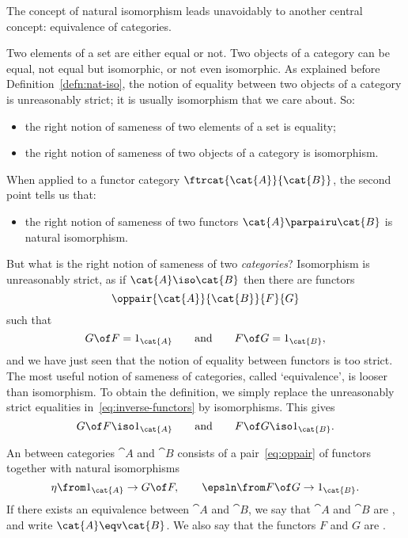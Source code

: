 The concept of natural isomorphism leads unavoidably to another central
concept: equivalence of categories.

%
%
Two elements of a set are either equal or not.  Two objects of a category
can be equal, not equal but isomorphic, or not even isomorphic.  As
explained before Definition~\ref{defn:nat-iso}, the notion of equality
between two objects of a category is unreasonably strict; it is usually
isomorphism that we care about.  So:
% 
\begin{itemize}
\item
the right notion of sameness of two elements of a set is
equality;

\item
the right notion of sameness of two objects of a category is
isomorphism.
\end{itemize}
% 
When applied to a functor category $\ftrcat{\cat{A}}{\cat{B}}$, the second
point tells us that:
% 
\begin{itemize}
\item
the right notion of sameness of two functors $\cat{A} \parpairu
\cat{B}$ is natural isomorphism. 
\end{itemize}
% 
But what is the right notion of sameness of two \emph{categories}?
Isomorphism is unreasonably strict, as if $\cat{A} \iso \cat{B}$ then
there are functors
% 
\begin{equation}        
\label{eq:oppair}
\oppair{\cat{A}}{\cat{B}}{F}{G}
\end{equation}
% 
such that 
% 
\begin{equation}
\label{eq:inverse-functors}
G \of F = 1_\cat{A}
\qquad
\text{and}
\qquad
F \of G = 1_\cat{B}, 
\end{equation}
% 
and we have just seen that the notion of equality between functors is too
strict.  The most useful notion of sameness of categories, called
`equivalence', is looser than isomorphism.  To obtain the definition, we
simply replace the unreasonably strict equalities
in~\eqref{eq:inverse-functors} by isomorphisms.  This gives
\[
G \of F \iso 1_\cat{A}
\qquad
\text{and}
\qquad
F \of G \iso 1_\cat{B}.
%
\index{sameness|)}
%
\]

\begin{defn}    
\label{defn:eqv}
An %
%
%
%
between categories $\cat{A}$ and $\cat{B}$ consists
of a pair~\eqref{eq:oppair} of functors together with natural isomorphisms
\[
\eta\from 1_\cat{A} \to G \of F,
\qquad
\epsln\from F \of G \to 1_\cat{B}.
\]
If there exists an equivalence between $\cat{A}$ and $\cat{B}$, we say that
$\cat{A}$ and $\cat{B}$ are , and write $\cat{A} \eqv
\cat{B}$.%
%
%
We also say that the functors $F$ and $G$ are .
\end{defn}

